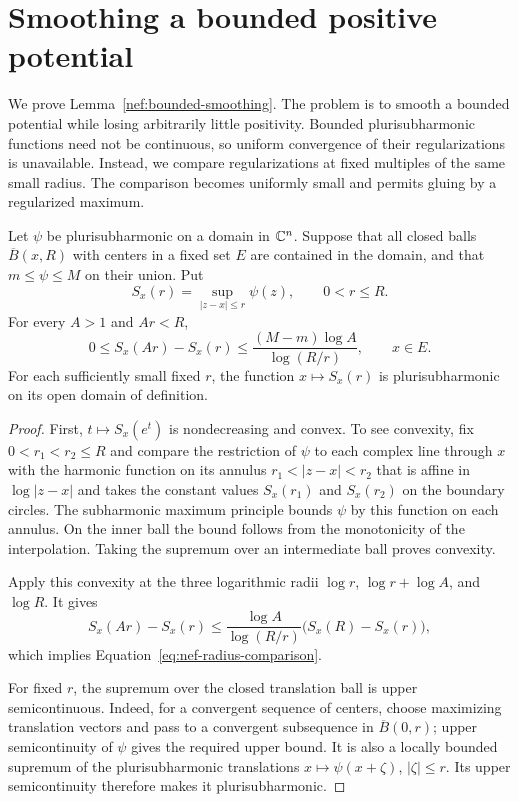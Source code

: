 \section{Smoothing a bounded positive potential}
\label{app:smoothing}

We prove Lemma~\ref{nef:bounded-smoothing}. The problem is to smooth
a bounded potential while losing arbitrarily little positivity.
Bounded plurisubharmonic functions need not be continuous, so uniform
convergence of their regularizations is unavailable. Instead, we
compare regularizations at fixed multiples of the same small radius.
The comparison becomes uniformly small and permits gluing by a
regularized maximum.

\begin{lemma}
\label{nef:radius-comparison}
Let $\psi$ be plurisubharmonic on a domain in $\mathbb C^n$.  Suppose that
all closed balls $\overline B(x,R)$ with centers in a fixed set $E$
are contained in the domain, and that $m\leq\psi\leq M$ on their
union.  Put
\[
 S_x(r)=\sup_{|z-x|\leq r}\psi(z),\qquad 0<r\leq R.
\]
For every $A>1$ and $Ar<R$,
\begin{equation}
 0\leq S_x(Ar)-S_x(r)
 \leq\frac{(M-m)\log A}{\log(R/r)},\qquad x\in E.
 \label{eq:nef-radius-comparison}
\end{equation}
For each sufficiently small fixed $r$, the function $x\mapsto S_x(r)$
is plurisubharmonic on its open domain of definition.
\end{lemma}

\begin{proof}
First, $t\mapsto S_x(e^t)$ is nondecreasing and convex.  To see
convexity, fix $0<r_1<r_2\leq R$ and compare the restriction of
$\psi$ to each complex line through $x$ with the harmonic function
on its annulus $r_1<|z-x|<r_2$ that is affine in $\log|z-x|$ and
takes the constant values $S_x(r_1)$ and $S_x(r_2)$ on the boundary
circles.  The subharmonic maximum principle bounds $\psi$ by this
function on each annulus.  On the inner ball the bound follows from
the monotonicity of the interpolation.  Taking the supremum over an
intermediate ball proves convexity.

Apply this convexity at the three logarithmic radii $\log r$,
$\log r+\log A$, and $\log R$.  It gives
\[
 S_x(Ar)-S_x(r)
 \leq\frac{\log A}{\log(R/r)}\bigl(S_x(R)-S_x(r)\bigr),
\]
which implies Equation~\eqref{eq:nef-radius-comparison}.

For fixed $r$, the supremum over the closed translation ball is
upper semicontinuous.  Indeed, for a convergent sequence of centers,
choose maximizing translation vectors and pass to a convergent
subsequence in $\overline B(0,r)$; upper semicontinuity of $\psi$
gives the required upper bound.  It is also a locally bounded
supremum of the plurisubharmonic translations
$x\mapsto\psi(x+\zeta)$, $|\zeta|\leq r$.  Its upper
semicontinuity therefore makes it plurisubharmonic.
\end{proof}

